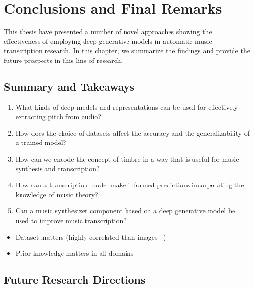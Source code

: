 
\graphicspath{{8-conclusions/figures/}}

\chapter{Conclusions and Final Remarks}
\label{ch:conclusions}

This thesis have presented a number of novel approaches showing the effectiveness of employing deep generative models in automatic music transcription research.
In this chapter, we summarize the findings and provide the future prospects in this line of research.

\section{Summary and Takeaways}


\begin{enumerate}
	\item What kinds of deep models and representations can be used for effectively extracting pitch from audio?
	\item How does the choice of datasets affect the accuracy and the generalizability of a trained model?
	\item How can we encode the concept of timbre in a way that is useful for music synthesis and transcription?
	\item How can a transcription model make informed predictions incorporating the knowledge of music theory?
	\item Can a music synthesizer component based on a deep generative model be used to improve music transcription?
\end{enumerate}

\begin{itemize}
	\item Dataset matters (highly correlated than images ~\cite{thickstun2018invariances})
	\item Prior knowledge matters in all domains
\end{itemize}


\section{Future Research Directions}

